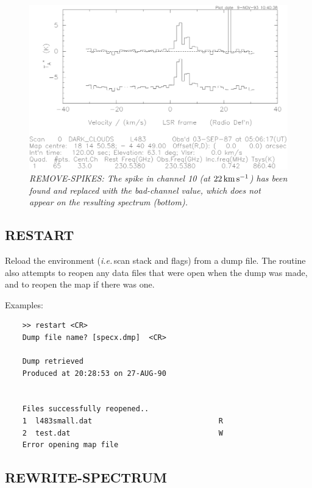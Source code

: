 \documentclass[11pt,twoside]{report}
\newcommand{\ie}{{\it i.e.\,}}
\newcommand{\kms}{{\rm\,km\,s^{-1}}}
\begin{document}
\begin{figure}[htbp]
\begin{center}
\includegraphics[scale=0.65]{rem-spikes.ps}
\protect\parbox{5.5in}
{\caption[SPIKES]
{\sl
REMOVE-SPIKES: The spike in channel 10 (at $22\kms$) has been found and
replaced with the bad-channel value, which does not appear on the
resulting spectrum (bottom).
\label{SPIKES}
}
}
\end{center}
\end{figure}

\subsection{RESTART} 

Reload the environment  (\ie scan stack
and flags) from a dump file. The routine also attempts to reopen any data files
that were open when the dump was made, and to reopen the map if there was one. 

Examples:
\begin{verbatim}
    >> restart <CR>
    Dump file name? [specx.dmp]  <CR>

    Dump retrieved
    Produced at 20:28:53 on 27-AUG-90


    Files successfully reopened..
    1  l483small.dat                             R 
    2  test.dat                                  W 
    Error opening map file

\end{verbatim}

\subsection{REWRITE-SPECTRUM} 
\end{document}
